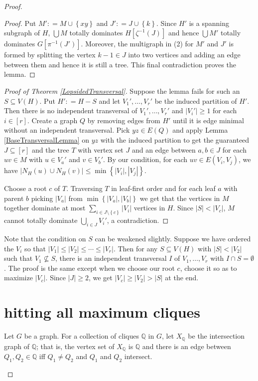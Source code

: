 \documentclass{amsbook}
\theoremstyle{plain}
\numberwithin{equation}{chapter}
\newcommand{\set}[1]{\left\{ #1 \right\}}
\newcommand{\card}[1]{\left|#1\right|}
\newcommand{\irange}[1]{\left[#1\right]}
\newcommand{\brackets}[1]{\left[ #1 \right]}
\newcommand{\DefinedAs}{\mathrel{\mathop:}=}
\newcommand{\Q}{\mathbb{Q}}
\begin{document}
\begin{proof}
\begin{proof}
Put $M' \DefinedAs M \cup \set{xy}$ and $J' \DefinedAs J \cup \set{k}$.
Since $H'$ is a spanning subgraph of $H$, $\bigcup M$ totally dominates
$H\brackets{\zeta^{-1}(J)}$ and hence $\bigcup M'$ totally dominates
$G\brackets{\pi^{-1}(J')}$.  Moreover, the multigraph in (2) for $M'$ and $J'$
is formed by splitting the vertex $k-1 \in J$ into two vertices and adding an edge
between them and hence it is still a tree.  This final contradiction proves the
lemma.
\end{proof}

\begin{proof}[Proof of Theorem \ref{LopsidedTransversal}]
Suppose the lemma fails for such an $S \subseteq V(H)$.  Put $H' \DefinedAs H - S$ and let $V_1', \ldots, V_r'$ be the induced partition of $H'$. Then there is no independent transversal of $V_1', \ldots, V_r'$ and $\card{V_i'} \geq 1$ for each $i \in \irange{r}$. Create a graph $Q$ by removing edges from $H'$ until it is edge minimal without an independent transversal. Pick $yz \in E(Q)$ and apply Lemma 
\ref{BaseTransversalLemma} on $yz$ with the induced partition to get the guaranteed 
$J \subseteq \irange{r}$ and the tree $T$ with vertex set $J$ and an edge between $a, b \in
J$ for each $uv \in M$ with $u \in V_a'$ and $v \in V_b'$.  By our condition, for each $uv \in E(V_i, V_j)$, we have $\card{N_H(u) \cup N_H(v)} \leq \min\set{\card{V_i}, \card{V_j}}$.

Choose a root $c$ of $T$. Traversing $T$ in leaf-first order and for each leaf $a$ with parent $b$ picking $|V_a|$ from $\min\set{|V_a|, |V_b|}$ we get that the vertices in $M$ together dominate at most $\sum_{i \in J \setminus \set{c}} \card{V_i}$ vertices in $H$.  Since $\card{S} < \card{V_c}$, $M$ cannot totally dominate $\bigcup_{i \in J} V_i'$, a contradiction.
\end{proof}

Note that the condition on $S$ can be weakened slightly.  Suppose we have ordered the $V_i$ so that $\card{V_1} \leq \card{V_2} \leq \cdots \leq \card{V_r}$.  Then for any $S \subseteq V(H)$ with $\card{S} < \card{V_2}$ such that $V_1 \not \subseteq S$, there is an independent transversal $I$ of $V_1, \ldots, V_r$ with $I \cap S = \emptyset$.  The proof is the same except when we choose our root $c$, choose it so as to maximize $\card{V_c}$.  
Since $\card{J} \geq 2$, we get $\card{V_c} \geq \card{V_2} > \card{S}$ at the end.

\section*{hitting all maximum cliques}
\begin{defn}
Let $G$ be a graph. For a collection of cliques $\Q$ in $G$, let $X_\Q$ be the intersection graph of $\Q$; that is, the 
vertex set of $X_\Q$ is $\Q$ and there is an edge between $Q_1, Q_2 \in \Q$ iff $Q_1 \ne Q_2$ and $Q_1$ and $Q_2$ intersect.
\end{defn}


\end{proof}
\end{document}
